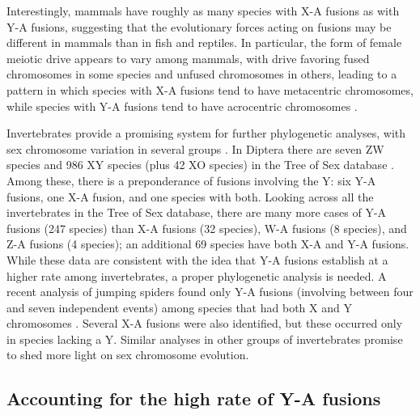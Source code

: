 Interestingly, mammals have roughly as many species with X-A fusions as with Y-A fusions, suggesting that the evolutionary forces acting on fusions may be different in mammals than in fish and reptiles. In particular, the form of female meiotic drive appears to vary among mammals, with drive favoring fused chromosomes in some species and unfused chromosomes in others, leading to a pattern in which species with X-A fusions tend to have metacentric chromosomes, while species with Y-A fusions tend to have acrocentric chromosomes \citep{Yoshida2012}.

Invertebrates provide a promising system for further phylogenetic analyses, with sex chromosome variation in several groups \citep{White1973, Bull1983, Charlesworth2005, ToS}. In Diptera there are seven ZW species and 986 XY species (plus 42 XO species) in the Tree of Sex database \citep{ToS}. Among these, there is a preponderance of fusions involving the Y: six Y-A fusions, one X-A fusion, and one species with both. Looking across all the invertebrates in the Tree of Sex database, there are many more cases of Y-A fusions (247 species) than X-A fusions (32 species), W-A fusions (8 species), and Z-A fusions (4 species); an additional 69 species have both X-A and Y-A fusions. While these data are consistent with the idea that Y-A fusions establish at a higher rate among invertebrates, a proper phylogenetic analysis is needed. A recent analysis of jumping spiders found only Y-A fusions (involving between four and seven independent events) among species that had both X and Y chromosomes \citep{White1973, Maddison2013}. Several X-A fusions were also identified, but these occurred only in species lacking a Y. Similar analyses in other groups of invertebrates promise to shed more light on sex chromosome evolution.

\subsection{Accounting for the high rate of Y-A fusions}

